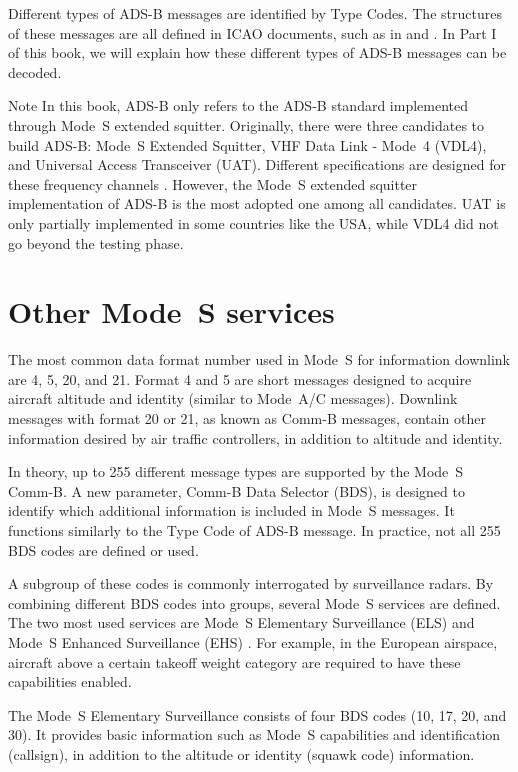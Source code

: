 Different types of ADS-B messages are identified by Type Codes. The structures of these messages are all defined in ICAO documents, such as in \cite{icao9871v1} and \cite{rtca2011mops}. In Part I of this book, we will explain how these different types of ADS-B messages can be decoded.

\begin{notebox}{Note}
  In this book, ADS-B only refers to the ADS-B standard implemented through Mode~S extended squitter. Originally, there were three candidates to build ADS-B: Mode~S Extended Squitter, VHF Data Link - Mode~4 (VDL4), and Universal Access Transceiver (UAT). Different specifications are designed for these frequency channels \cite{rtca2011mops, rtca2002uat}. However, the Mode~S extended squitter implementation of ADS-B is the most adopted one among all candidates. UAT is only partially implemented in some countries like the USA, while VDL4 did not go beyond the testing phase.
\end{notebox}


\section{Other Mode~S services}

The most common data format number used in Mode~S for information downlink are 4, 5, 20, and 21. Format 4 and 5 are short messages designed to acquire aircraft altitude and identity (similar to Mode~A/C messages). Downlink messages with format 20 or 21, as known as Comm-B messages, contain other information desired by air traffic controllers, in addition to altitude and identity.

In theory, up to 255 different message types are supported by the Mode~S Comm-B. A new parameter, Comm-B Data Selector (BDS), is designed to identify which additional information is included in Mode~S messages. It functions similarly to the Type Code of ADS-B message. In practice, not all 255 BDS codes are defined or used. 

A subgroup of these codes is commonly interrogated by surveillance radars. By combining different BDS codes into groups, several Mode~S services are defined. The two most used services are Mode~S Elementary Surveillance (ELS) and Mode~S Enhanced Surveillance (EHS) \cite{grappel2008}. For example, in the European airspace, aircraft above a certain takeoff weight category are required to have these capabilities enabled.

The Mode~S Elementary Surveillance consists of four BDS codes (10, 17, 20, and 30). It provides basic information such as Mode~S capabilities and identification (callsign), in addition to the altitude or identity (squawk code) information. 

